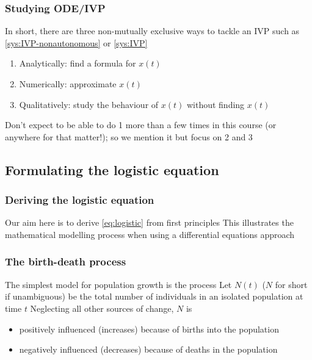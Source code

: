 \documentclass[aspectratio=169]{beamer}
\begin{document}
\begin{frame}\frametitle{Studying ODE/IVP}
In short, there are three non-mutually exclusive ways to tackle an IVP such as \eqref{sys:IVP-nonautonomous} or \eqref{sys:IVP}
\vfill
\begin{enumerate}
\item Analytically: find a formula for $x(t)$
\vfill
\item Numerically: approximate $x(t)$
\vfill
\item Qualitatively: study the behaviour of $x(t)$ without finding $x(t)$
\end{enumerate}
\vfill
Don't expect to be able to do 1 more than a few times in this course (or anywhere for that matter!); so we mention it but focus on 2 and 3
\end{frame}


\subsection{Formulating the logistic equation}


\begin{frame}\frametitle{Deriving the logistic equation}
Our aim here is to derive \eqref{eq:logistic} from first principles
\vfill
This illustrates the mathematical modelling process when using a differential equations approach
\end{frame}

\begin{frame}\frametitle{The birth-death process}
The simplest model for population growth is the  process
\vfill
Let $N(t)$ ($N$ for short if unambiguous) be the total number of individuals in an isolated population at time $t$
\vfill
Neglecting all other sources of change, $N$ is
\begin{itemize}
\item positively influenced (increases) because of births into the population
\item negatively influenced (decreases) because of deaths in the population
\end{itemize}
\end{frame}
\end{document}
